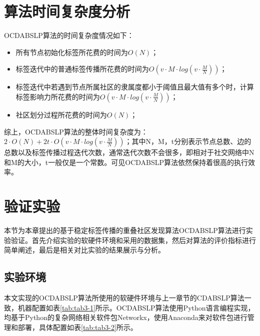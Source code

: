 \section{算法时间复杂度分析}

OCDABSLP算法的时间复杂度情况如下：

\begin{itemize}
  \item 所有节点初始化标签所花费的时间为$O(N)$；
  \item 标签迭代中的普通标签传播所花费的时间为$O(v \cdot M \cdot log(v \cdot \frac{M}{N}))$；
  \item 标签迭代中若遇到节点所属社区的隶属度都小于阈值且最大值有多个时，计算标签影响力所花费的时间为$O(v \cdot M \cdot log(v \cdot \frac{M}{N}))$；
  \item 社区划分过程所花费的时间为$O(N)$；
\end{itemize}

综上，OCDABSLP算法的整体时间复杂度为：$2 \cdot O(N)+2t \cdot O(v \cdot M \cdot log(v \cdot \frac{M}{N}))$；其中N，M，t分别表示节点总数、边的总数以及标签传播过程迭代次数，通常迭代次数不会很多，即相对于社交网络中N和M的大小，t一般仅是一个常数。可见OCDABSLP算法依然保持着很高的执行效率。






\section{验证实验}
本节为本章提出的基于稳定标签传播的重叠社区发现算法OCDABSLP算法进行实验验证。首先介绍实验的软硬件环境和采用的数据集，然后对算法的评价指标进行简单阐述，最后是相关对比实验的结果展示与分析。

\subsection{实验环境}
本文实现的OCDABSLP算法所使用的软硬件环境与上一章节的CDABSLP算法一致，机器配置如表\ref{tab:tab3-1}所示。OCDABSLP算法使用Python语言编程实现，均基于Python的复杂网络相关软件包Networkx，使用Anaconda来对软件包进行管理和部署，具体配置如表\ref{tab:tab3-2}所示。

